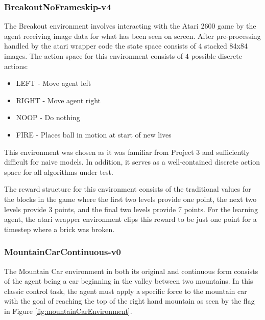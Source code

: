 \documentclass[conference]{IEEEtran}
\begin{document}
\subsubsection{BreakoutNoFrameskip-v4}
The Breakout environment involves interacting with the Atari 2600 game by the agent receiving image data for what has been seen on screen.
After pre-processing handled by the atari wrapper code the state space consists of 4 stacked 84x84 images.
The action space for this environment consists of 4 possible discrete actions:

\begin{itemize}
    \item LEFT - Move agent left
    \item RIGHT - Move agent right
    \item NOOP - Do nothing
    \item FIRE - Places ball in motion at start of new lives
\end{itemize}

This environment was chosen as it was familiar from Project 3 and sufficiently difficult for naive models.
In addition, it serves as a well-contained discrete action space for all algorithms under test.

The reward structure for this environment consists of the traditional values for the blocks in the game where the first two levels provide one point, the next two levels provide 3 points, and the final two levels provide 7 points.
For the learning agent, the atari wrapper environment clips this reward to be just one point for a timestep where a brick was broken.

\subsubsection{MountainCarContinuous-v0}
The Mountain Car environment in both its original and continuous form consists of the agent being a car beginning in the valley between two mountains.
In this classic control task, the agent must apply a specific force to the mountain car with the goal of reaching the top of the right hand mountain as seen by the flag in Figure \ref{fig:mountainCarEnvironment}.
\end{document}
